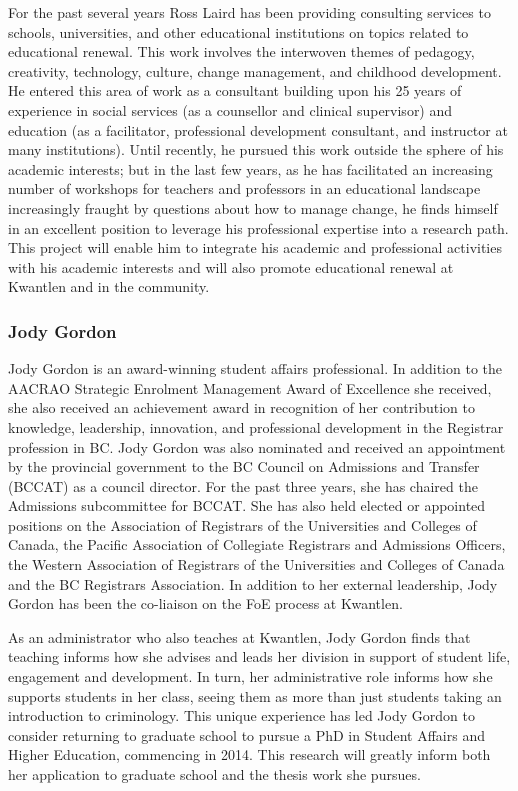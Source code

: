 \documentclass[letterpaper,10pt,headsepline]{scrreprt}
\begin{document}
For the past several years Ross Laird has been providing consulting services
to schools, universities, and other educational institutions on topics related
to educational renewal. This work involves the interwoven themes of pedagogy,
creativity, technology, culture, change management, and childhood development.
He entered this area of work as a consultant building upon his 25 years of
experience in social services (as a counsellor and clinical supervisor) and
education (as a facilitator, professional development consultant, and
instructor at many institutions). Until recently, he pursued this work outside
the sphere of his academic interests; but in the last few years, as he has
facilitated an increasing number of workshops for teachers and professors in
an educational landscape increasingly fraught by questions about how to manage
change, he finds himself in an excellent position to leverage his professional
expertise into a research path. This project will enable him to integrate his
academic and professional activities with his academic interests and will also
promote educational renewal at Kwantlen and in the community.


\subsubsection{Jody Gordon}

Jody Gordon is an award-winning student affairs professional. In addition to
the AACRAO Strategic Enrolment Management Award of Excellence she received,
she also received an achievement award in recognition of her contribution to
knowledge, leadership, innovation, and professional development in the
Registrar profession in BC. Jody Gordon was also nominated and received an
appointment by the provincial government to the BC Council on Admissions and
Transfer (BCCAT) as a council director. For the past three years, she has
chaired the Admissions subcommittee for BCCAT. She has also held elected or
appointed positions on the Association of Registrars of the Universities and
Colleges of Canada, the Pacific Association of Collegiate Registrars and
Admissions Officers, the Western Association of Registrars of the Universities
and Colleges of Canada and the BC Registrars Association. In addition to her
external leadership, Jody Gordon has been the co-liaison on the FoE process at
Kwantlen.

As an administrator who also teaches at Kwantlen, Jody Gordon finds that
teaching informs how she advises and leads her division in support of student
life, engagement and development. In turn, her administrative role informs how
she supports students in her class, seeing them as more than just students
taking an introduction to criminology. This unique experience has led Jody
Gordon to consider returning to graduate school to pursue a PhD in Student
Affairs and Higher Education, commencing in 2014. This research will greatly
inform both her application to graduate school and the thesis work she
pursues.
\end{document}
